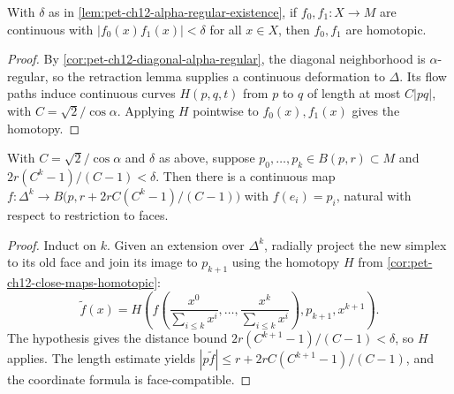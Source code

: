\begin{corollary}
  \label{cor:pet-ch12-close-maps-homotopic}
  With $\delta$ as in \cref{lem:pet-ch12-alpha-regular-existence}, if
  $f_0,f_1:X\to M$ are continuous with $|f_0(x)f_1(x)|<\delta$ for all $x\in X$,
  then $f_0,f_1$ are homotopic.
\end{corollary}
\begin{proof}
  \sketch
  By \cref{cor:pet-ch12-diagonal-alpha-regular}, the diagonal neighborhood is
  \(\alpha\)-regular, so the retraction lemma
  supplies a continuous deformation to \(\Delta\). Its flow paths induce
  continuous curves \(H(p,q,t)\) from \(p\) to \(q\) of length at most
  \(C|pq|\), with \(C=\sqrt2/\cos\alpha\). Applying \(H\) pointwise to
  \(f_0(x),f_1(x)\) gives the homotopy.
\end{proof}

\begin{lemma}
  \label{lem:pet-ch12-simplex-extension}
  With $C=\sqrt2/\cos\alpha$ and $\delta$ as above, suppose
  $p_0,\dots,p_k\in B(p,r)\subset M$ and $2r(C^k-1)/(C-1)<\delta$. Then there is
  a continuous map $f:\Delta^k\to B\big(p,r+2rC(C^k-1)/(C-1)\big)$ with
  $f(e_i)=p_i$, natural with respect to restriction to faces.
\end{lemma}
\begin{proof}
  \sketch
  Induct on \(k\). Given an extension over \(\Delta^k\), radially project the
  new simplex to its old face and join its image to \(p_{k+1}\) using the
  homotopy \(H\) from \cref{cor:pet-ch12-close-maps-homotopic}:
  \[\widetilde f(x)=H\left(f\left(\frac{x^0}{\sum_{i\le k}x^i},\ldots,
      \frac{x^k}{\sum_{i\le k}x^i}\right),p_{k+1},x^{k+1}\right).\]
  The hypothesis gives the distance bound \(2r(C^{k+1}-1)/(C-1)<\delta\),
  so \(H\) applies. The length estimate yields
  \( |p\widetilde f|\le r+2rC(C^{k+1}-1)/(C-1)\), and the coordinate
  formula is face-compatible.
\end{proof}

